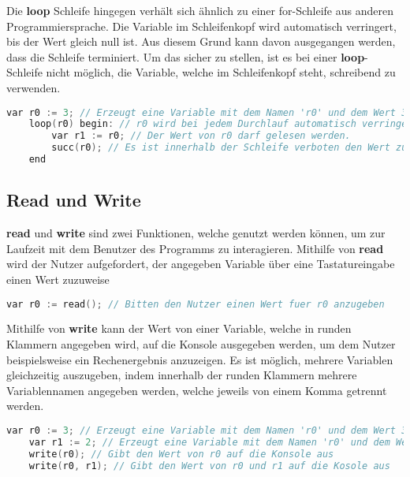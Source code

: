 Die \textbf{loop} Schleife hingegen verhält sich ähnlich zu einer for-Schleife aus anderen Programmiersprache. Die Variable im Schleifenkopf wird automatisch verringert, bis der Wert gleich null ist. Aus diesem Grund kann davon ausgegangen werden, dass die Schleife terminiert. Um das sicher zu stellen, ist es bei einer \textbf{loop}-Schleife nicht möglich, die Variable, welche im Schleifenkopf steht, schreibend zu verwenden.

\begin{lstlisting}[language=c, caption=loop-Schleife in While, label={lst:while-loop}]
	var r0 := 3; // Erzeugt eine Variable mit dem Namen 'r0' und dem Wert 3
	loop(r0) begin: // r0 wird bei jedem Durchlauf automatisch verringert
		var r1 := r0; // Der Wert von r0 darf gelesen werden.
		succ(r0); // Es ist innerhalb der Schleife verboten den Wert zu aendern!
	end
\end{lstlisting}

\subsection{Read und Write}
\textbf{read} und \textbf{write} sind zwei Funktionen, welche genutzt werden können, um zur Laufzeit mit dem Benutzer des Programms zu interagieren. Mithilfe von \textbf{read} wird der Nutzer aufgefordert, der angegeben Variable über eine Tastatureingabe einen Wert zuzuweise

\begin{lstlisting}[language=c, caption=read in While, label={lst:while-var-read}]
	var r0 := read(); // Bitten den Nutzer einen Wert fuer r0 anzugeben
\end{lstlisting}

Mithilfe von \textbf{write} kann der Wert von einer Variable, welche in runden Klammern angegeben wird, auf die Konsole ausgegeben werden, um dem Nutzer beispielsweise ein Rechenergebnis anzuzeigen. Es ist möglich, mehrere Variablen gleichzeitig auszugeben, indem innerhalb der runden Klammern mehrere Variablennamen angegeben werden, welche jeweils von einem Komma getrennt werden.

\begin{lstlisting}[language=c, caption=write in While, label={lst:while-write}]
	var r0 := 3; // Erzeugt eine Variable mit dem Namen 'r0' und dem Wert 3
	var r1 := 2; // Erzeugt eine Variable mit dem Namen 'r0' und dem Wert 3
	write(r0); // Gibt den Wert von r0 auf die Konsole aus
	write(r0, r1); // Gibt den Wert von r0 und r1 auf die Kosole aus
\end{lstlisting}

